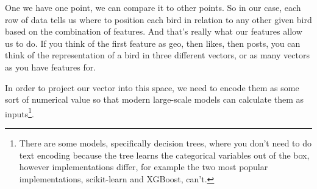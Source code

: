 \documentclass[draft, 11pt]{diazessay} %
\begin{document}


One we have one point, we can compare it to other points. So in our case, each row of data tells us where to position each bird in relation to any other given bird based on the combination of features.  And that's really what our features allow us to do. If you think of the first feature as geo, then likes, then posts, you can think of the representation of a bird in three different vectors, or as many vectors as you have features for. 

In order to project our vector into this space, we need to encode them as some sort of numerical value so that modern large-scale models\citep{lakshmanan2020machine} can calculate them as inputs\footnote{There are some models, specifically decision trees, where you don't need to do text encoding because the tree learns the categorical variables out of the box, however implementations differ, for example the two most popular implementations, scikit-learn and XGBoost\citep{altay_2020}, can't.}. 
\end{document}
